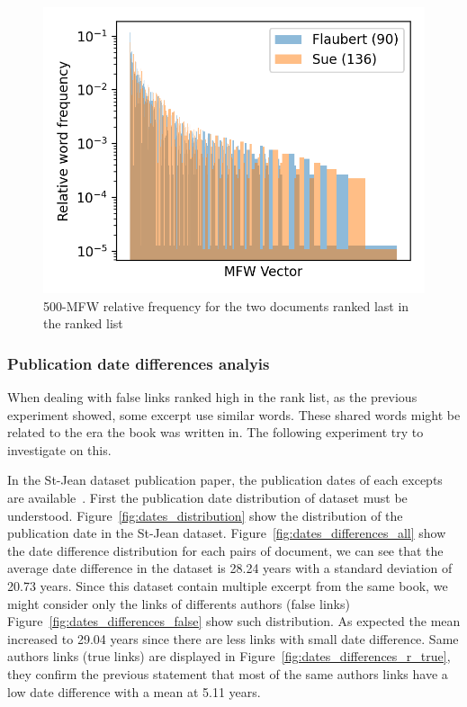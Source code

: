 \begin{figure}
  \includegraphics[width=\linewidth]{img/mfw_vector_last_rl.png}
  \caption{500-MFW relative frequency for the two documents ranked last in the ranked list}
  \label{fig:mfw_vector_last_rl}
\end{figure}

\subsubsection{Publication date differences analyis}

When dealing with false links ranked high in the rank list, as the previous experiment showed, some excerpt use similar words.
These shared words might be related to the era the book was written in.
The following experiment try to investigate on this.

In the St-Jean dataset publication paper, the publication dates of each excepts are available~\cite{st_jean}.
First the publication date distribution of dataset must be understood.
Figure~\ref{fig:dates_distribution} show the distribution of the publication date in the St-Jean dataset.
Figure~\ref{fig:dates_differences_all} show the date difference distribution for each pairs of document, we can see that the average date difference in the dataset is 28.24 years with a standard deviation of 20.73 years.
Since this dataset contain multiple excerpt from the same book, we might consider only the links of differents authors (false links) Figure~\ref{fig:dates_differences_false} show such distribution.
As expected the mean increased to 29.04 years since there are less links with small date difference.
Same authors links (true links) are displayed in Figure~\ref{fig:dates_differences_r_true}, they confirm the previous statement that most of the same authors links have a low date difference with a mean at 5.11 years.

